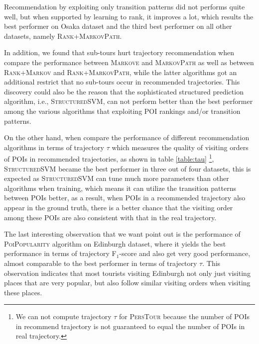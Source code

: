 Recommendation by exploiting only transition patterns did not performs quite well,
but when supported by learning to rank, it improves a lot, which results the best performer on Osaka dataset and
the third best performer on all other datasets, namely \textsc{Rank+MarkovPath}.

In addition, we found that sub-tours hurt trajectory recommendation when compare the performance between
\textsc{Markove} and \textsc{MarkovPath} as well as between \textsc{Rank+Markov} and 
\textsc{Rank+MarkovPath}, while the latter algorithms got an additional restrict that no sub-tours 
occur in recommended trajectories.
% 
This discovery could also be the reason that the sophisticated structured prediction algorithm, 
i.e., \textsc{StructuredSVM}, can not perform better than the best performer among the various algorithms
that exploiting POI rankings and/or transition patterns.


On the other hand, when compare the performance of different recommendation algorithms in terms of trajectory $\tau$
which measures the quality of visiting orders of POIs in recommended trajectories,
as shown in table \ref{table:tau}
\footnote{We can not compute trajectory $\tau$ for \textsc{PersTour} because the number of POIs in recommend trajectory 
is not guaranteed to equal the number of POIs in real trajectory.},
\textsc{StructuredSVM} became the best performer in three out of four datasets,
this is expected as \textsc{StructuredSVM} can tune much more parameters than other algorithms when training,
which means it can utilize the transition patterns between POIs better,
as a result, when POIs in a recommended trajectory also appear in the ground truth, 
there is a better chance that the visiting order among these POIs are also consistent with 
that in the real trajectory.

% 
The last interesting observation that we want point out is the performance of \textsc{PoiPopularity} algorithm
on Edinburgh dataset, where it yields the best performance in terms of trajectory F$_1$-score and 
also get very good performance, almost comparable to the best performer in terms of trajectory $\tau$.
This observation indicates that most tourists visiting Edinburgh not only just visiting
places that are very popular, but also follow similar visiting orders when visiting these places.


